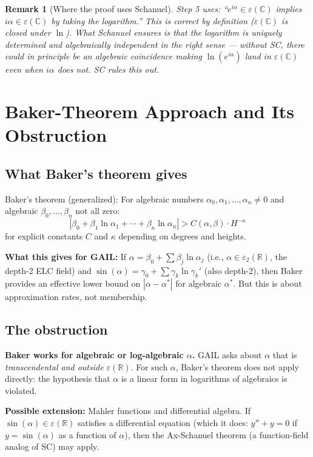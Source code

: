 \documentclass[11pt]{article}
\newtheorem{remark}[theorem]{Remark}
\begin{document}
\begin{remark}[Where the proof uses Schanuel]
Step 5 uses: ``$e^{i\alpha} \in \varepsilon(\mathbb{C})$ implies $i\alpha \in \varepsilon(\mathbb{C})$
by taking the logarithm.'' This is correct by definition ($\varepsilon(\mathbb{C})$
is closed under $\ln$). What Schanuel ensures is that the logarithm is
\emph{uniquely determined and algebraically independent} in the right sense —
without SC, there could in principle be an algebraic coincidence making
$\ln(e^{i\alpha})$ land in $\varepsilon(\mathbb{C})$ even when $i\alpha$ does not.
SC rules this out.
\end{remark}

\section{Baker-Theorem Approach and Its Obstruction}

\subsection{What Baker's theorem gives}

Baker's theorem (generalized): For algebraic numbers $\alpha_0, \alpha_1, \ldots, \alpha_n \neq 0$
and algebraic $\beta_0, \ldots, \beta_n$ not all zero:
\[
|\beta_0 + \beta_1 \ln \alpha_1 + \cdots + \beta_n \ln \alpha_n| > C(\alpha, \beta) \cdot H^{-\kappa}
\]
for explicit constants $C$ and $\kappa$ depending on degrees and heights.

\textbf{What this gives for GAIL:} If $\alpha = \beta_0 + \sum \beta_j \ln \alpha_j$
(i.e., $\alpha \in \varepsilon_2(\mathbb{R})$, the depth-2 ELC field) and
$\sin(\alpha) = \gamma_0 + \sum \gamma_k \ln \gamma_k'$ (also depth-2), then
Baker provides an effective lower bound on $|\alpha - \alpha^*|$ for algebraic $\alpha^*$.
But this is about approximation rates, not membership.

\subsection{The obstruction}

\textbf{Baker works for algebraic or log-algebraic $\alpha$.}
GAIL asks about $\alpha$ that is \emph{transcendental and outside $\varepsilon(\mathbb{R})$}.
For such $\alpha$, Baker's theorem does not apply directly:
the hypothesis that $\alpha$ is a linear form in logarithms of algebraics is violated.

\textbf{Possible extension:} Mahler functions and differential algebra.
If $\sin(\alpha) \in \varepsilon(\mathbb{R})$ satisfies a differential equation
(which it does: $y'' + y = 0$ if $y = \sin(\alpha)$ as a function of $\alpha$),
then the Ax-Schanuel theorem (a function-field analog of SC) may apply.
\end{document}
